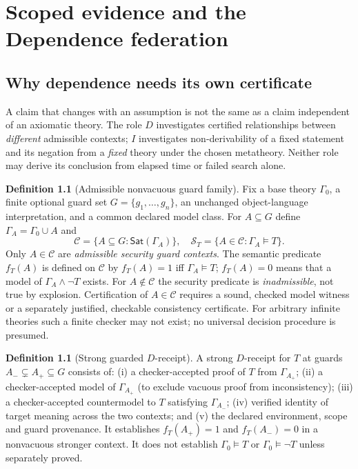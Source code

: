 \documentclass[11pt,letterpaper,oneside]{book}
\theoremstyle{definition}
\newtheorem{definition}[theorem]{Definition}
\theoremstyle{remark}
\newcommand{\Sat}{\mathsf{Sat}}
\begin{document}
\chapter{Scoped evidence and the Dependence federation}
\section{Why dependence needs its own certificate}
A claim that changes with an assumption is not the same as a claim
independent of an axiomatic theory. The role $D$ investigates certified
relationships between \emph{different} admissible contexts; $I$
investigates non-derivability of a fixed statement and its negation
from a \emph{fixed} theory under the chosen metatheory. Neither role
may derive its conclusion from elapsed time or failed search alone.

\begin{definition}[Admissible nonvacuous guard family]
Fix a base theory $\Gamma_0$, a finite optional guard set
$G=\{g_1,\ldots,g_n\}$, an unchanged object-language interpretation,
and a common declared model class. For $A\subseteq G$ define
$\Gamma_A=\Gamma_0\cup A$ and
\[
\mathcal C=\{A\subseteq G:\Sat(\Gamma_A)\},\quad
\mathcal S_T=\{A\in\mathcal C:\Gamma_A\models T\}.
\]
Only $A\in\mathcal C$ are \emph{admissible security guard contexts}.
The semantic predicate $f_T(A)$ is defined on $\mathcal C$ by
$f_T(A)=1$ iff $\Gamma_A\models T$; $f_T(A)=0$ means that a model
of $\Gamma_A\land\neg T$ exists. For $A\notin\mathcal C$ the
security predicate is \emph{inadmissible}, not true by explosion.
Certification of $A\in\mathcal C$ requires a sound, checked model
witness or a separately justified, checkable consistency certificate.
For arbitrary infinite theories such a finite checker may not exist;
no universal decision procedure is presumed.
\end{definition}

\begin{definition}[Strong guarded $D$-receipt]
A strong $D$-receipt for $T$ at guards $A_-\subsetneq A_+\subseteq G$
consists of: (i) a checker-accepted proof of $T$ from $\Gamma_{A_+}$;
(ii) a checker-accepted model of $\Gamma_{A_+}$ (to exclude
vacuous proof from inconsistency); (iii) a checker-accepted countermodel
to $T$ satisfying $\Gamma_{A_-}$; (iv) verified identity of target
meaning across the two contexts; and (v) the declared environment,
scope and guard provenance. It establishes $f_T(A_+)=1$ and
$f_T(A_-)=0$ in a nonvacuous stronger context.
It does not establish $\Gamma_0\models T$ or
$\Gamma_0\models\neg T$ unless separately proved.
\end{definition}
\end{document}
